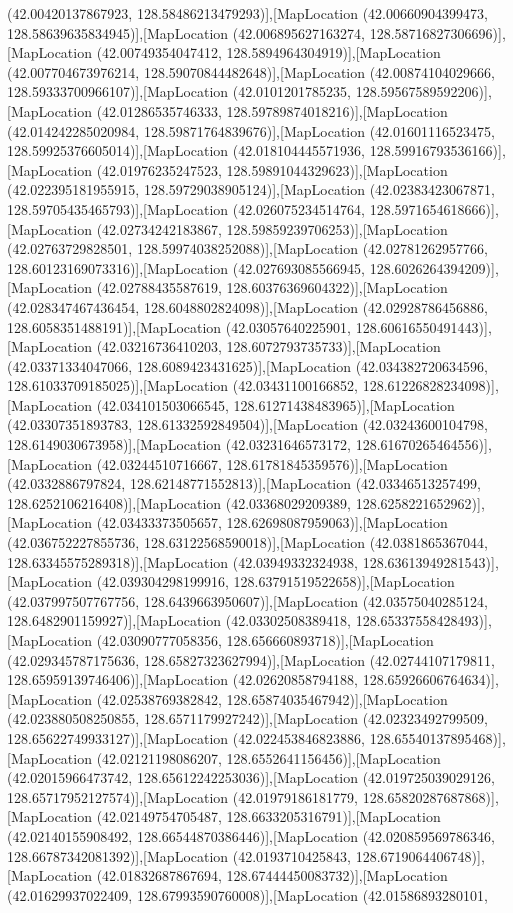 (42.00420137867923, 128.58486213479293)],[MapLocation (42.00660904399473, 128.58639635834945)],[MapLocation (42.006895627163274, 128.58716827306696)],[MapLocation (42.00749354047412, 128.5894964304919)],[MapLocation (42.007704673976214, 128.59070844482648)],[MapLocation (42.00874104029666, 128.59333700966107)],[MapLocation (42.0101201785235, 128.59567589592206)],[MapLocation (42.01286535746333, 128.59789874018216)],[MapLocation (42.014242285020984, 128.59871764839676)],[MapLocation (42.01601116523475, 128.59925376605014)],[MapLocation (42.018104445571936, 128.59916793536166)],[MapLocation (42.01976235247523, 128.59891044329623)],[MapLocation (42.022395181955915, 128.59729038905124)],[MapLocation (42.02383423067871, 128.59705435465793)],[MapLocation (42.026075234514764, 128.5971654618666)],[MapLocation (42.02734242183867, 128.59859239706253)],[MapLocation (42.02763729828501, 128.59974038252088)],[MapLocation (42.02781262957766, 128.60123169073316)],[MapLocation (42.027693085566945, 128.6026264394209)],[MapLocation (42.02788435587619, 128.60376369604322)],[MapLocation (42.028347467436454, 128.6048802824098)],[MapLocation (42.02928786456886, 128.6058351488191)],[MapLocation (42.03057640225901, 128.60616550491443)],[MapLocation (42.03216736410203, 128.6072793735733)],[MapLocation (42.03371334047066, 128.6089423431625)],[MapLocation (42.034382720634596, 128.61033709185025)],[MapLocation (42.03431100166852, 128.61226828234098)],[MapLocation (42.034101503066545, 128.61271438483965)],[MapLocation (42.03307351893783, 128.61332592849504)],[MapLocation (42.03243600104798, 128.6149030673958)],[MapLocation (42.03231646573172, 128.61670265464556)],[MapLocation (42.03244510716667, 128.61781845359576)],[MapLocation (42.0332886797824, 128.62148771552813)],[MapLocation (42.03346513257499, 128.6252106216408)],[MapLocation (42.03368029209389, 128.6258221652962)],[MapLocation (42.03433373505657, 128.62698087959063)],[MapLocation (42.036752227855736, 128.63122568590018)],[MapLocation (42.0381865367044, 128.63345575289318)],[MapLocation (42.03949332324938, 128.63613949281543)],[MapLocation (42.039304298199916, 128.63791519522658)],[MapLocation (42.037997507767756, 128.6439663950607)],[MapLocation (42.03575040285124, 128.6482901159927)],[MapLocation (42.03302508389418, 128.65337558428493)],[MapLocation (42.03090777058356, 128.656660893718)],[MapLocation (42.029345787175636, 128.65827323627994)],[MapLocation (42.02744107179811, 128.65959139746406)],[MapLocation (42.02620858794188, 128.65926606764634)],[MapLocation (42.02538769382842, 128.65874035467942)],[MapLocation (42.023880508250855, 128.6571179927242)],[MapLocation (42.02323492799509, 128.65622749933127)],[MapLocation (42.022453846823886, 128.65540137895468)],[MapLocation (42.02121198086207, 128.6552641156456)],[MapLocation (42.02015966473742, 128.65612242253036)],[MapLocation (42.019725039029126, 128.65717952127574)],[MapLocation (42.01979186181779, 128.65820287687868)],[MapLocation (42.02149754705487, 128.6633205316791)],[MapLocation (42.02140155908492, 128.66544870386446)],[MapLocation (42.020859569786346, 128.66787342081392)],[MapLocation (42.0193710425843, 128.6719064406748)],[MapLocation (42.01832687867694, 128.67444450083732)],[MapLocation (42.01629937022409, 128.67993590760008)],[MapLocation (42.01586893280101, 